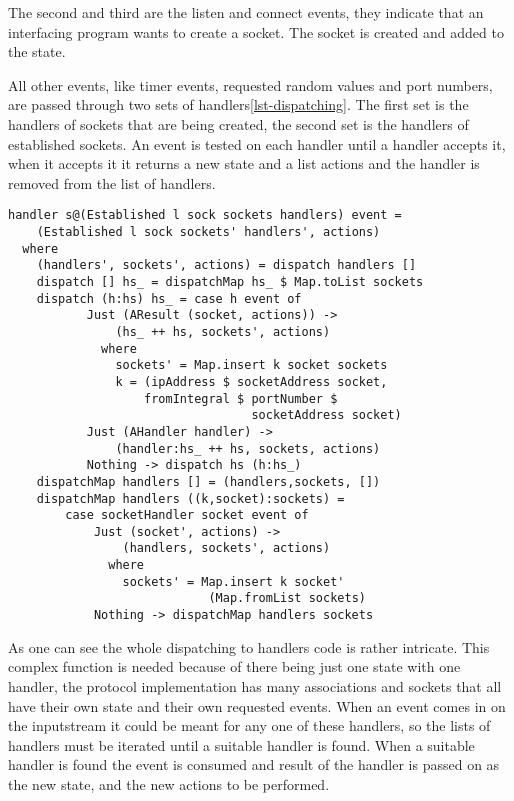 The second and third are the listen and connect events, they indicate that an interfacing program wants to create a socket. The socket is created and added to the state.

All other events, like timer events, requested random values and port numbers, are passed through two sets of handlers\ref{lst-dispatching}. The first set is the handlers of sockets that are being created, the second set is the handlers of established sockets. An event is tested on each handler until a handler accepts it, when it accepts it it returns a new state and a list actions and the handler is removed from the list of handlers.

\begin{lstlisting}[caption={Dispatching to handlers},label={lst-dispatching}]
handler s@(Established l sock sockets handlers) event =
    (Established l sock sockets' handlers', actions)
  where
    (handlers', sockets', actions) = dispatch handlers []
    dispatch [] hs_ = dispatchMap hs_ $ Map.toList sockets
    dispatch (h:hs) hs_ = case h event of
           Just (AResult (socket, actions)) ->
               (hs_ ++ hs, sockets', actions)
             where
               sockets' = Map.insert k socket sockets
               k = (ipAddress $ socketAddress socket,
                   fromIntegral $ portNumber $
                                  socketAddress socket)
           Just (AHandler handler) ->
               (handler:hs_ ++ hs, sockets, actions)
           Nothing -> dispatch hs (h:hs_)
    dispatchMap handlers [] = (handlers,sockets, [])
    dispatchMap handlers ((k,socket):sockets) =
        case socketHandler socket event of
            Just (socket', actions) -> 
                (handlers, sockets', actions)
              where
                sockets' = Map.insert k socket'
                            (Map.fromList sockets)
            Nothing -> dispatchMap handlers sockets
\end{lstlisting}

As one can see the whole dispatching to handlers code is rather intricate. This complex function is needed because of there being just one state with one handler, the protocol implementation has many associations and sockets that all have their own state and their own requested events.
When an event comes in on the inputstream it could be meant for any one of these handlers, so the lists of handlers must be iterated until a suitable handler is found. 
When a suitable handler is found the event is consumed and result of the handler is passed on as the new state, and the new actions to be performed.

